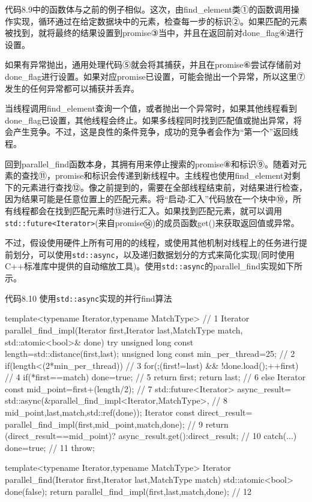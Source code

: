 代码8.9中的函数体与之前的例子相似。这次，由find\_element类①的函数调用操作实现，循环通过在给定数据块中的元素，检查每一步的标识②。如果匹配的元素被找到，就将最终的结果设置到promise③当中，并且在返回前对done\_flag④进行设置。

如果有异常抛出，通用处理代码⑤就会将其捕获，并且在promise⑥尝试存储前对done\_flag进行设置。如果对应promise已设置，可能会抛出一个异常，所以这里⑦发生的任何异常都可以捕获并丢弃。

当线程调用find\_element查询一个值，或者抛出一个异常时，如果其他线程看到done\_flag已设置，其他线程会终止。如果多线程同时找到匹配值或抛出异常，将会产生竞争。不过，这是良性的条件竞争，成功的竞争者会作为“第一个”返回线程。

回到parallel\_find函数本身，其拥有用来停止搜索的promise⑧和标识⑨。随着对元素的查找⑪，promise和标识会传递到新线程中。主线程也使用find\_element对剩下的元素进行查找⑫。像之前提到的，需要在全部线程结束前，对结果进行检查，因为结果可能是任意位置上的匹配元素。将“启动-汇入”代码放在一个块中⑩，所有线程都会在找到匹配元素时⑬进行汇入。如果找到匹配元素，就可以调用\texttt{std::future<Iterator>}(来自promise⑭)的成员函数get()来获取返回值或异常。

不过，假设使用硬件上所有可用的的线程，或使用其他机制对线程上的任务进行提前划分，可以使用\texttt{std::async}，以及递归数据划分的方式来简化实现(同时使用C++标准库中提供的自动缩放工具)。使用\texttt{std::async}的parallel\_find实现如下所示。

代码8.10 使用\texttt{std::async}实现的并行find算法

\begin{cpp}
template<typename Iterator,typename MatchType>  // 1
Iterator parallel_find_impl(Iterator first,Iterator last,MatchType match,
                            std::atomic<bool>& done)
{
  try
  {
    unsigned long const length=std::distance(first,last);
    unsigned long const min_per_thread=25;  // 2
    if(length<(2*min_per_thread))  // 3
    {
      for(;(first!=last) && !done.load();++first)  // 4
      {
        if(*first==match)
        {
          done=true;  // 5
          return first;
        }
      }
      return last;  // 6
    }
    else
    {
      Iterator const mid_point=first+(length/2);  // 7
      std::future<Iterator> async_result=
        std::async(&parallel_find_impl<Iterator,MatchType>,  // 8
                   mid_point,last,match,std::ref(done));
      Iterator const direct_result=
        parallel_find_impl(first,mid_point,match,done);  // 9
      return (direct_result==mid_point)?
        async_result.get():direct_result;  // 10
    }
  }
  catch(...)
  {
    done=true;  // 11
    throw;
  }
}

template<typename Iterator,typename MatchType>
Iterator parallel_find(Iterator first,Iterator last,MatchType match)
{
  std::atomic<bool> done(false);
  return parallel_find_impl(first,last,match,done);  // 12
}
\end{cpp}

